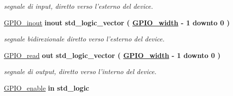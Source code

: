 \begin{DoxyCompactItemize}
\begin{DoxyCompactList}\small\item\em segnale di input, diretto verso l'esterno del device. \end{DoxyCompactList}\item 
\hypertarget{group__my_g_p_i_o_ga8829699d739ef35a4c5da396ffd38387}{\hyperlink{group__my_g_p_i_o_ga8829699d739ef35a4c5da396ffd38387}{G\+P\+I\+O\+\_\+inout}  {\bfseries {\bfseries \textcolor{vhdlchar}{inout}\textcolor{vhdlchar}{ }}} {\bfseries \textcolor{vhdlchar}{std\+\_\+logic\+\_\+vector}\textcolor{vhdlchar}{ }\textcolor{vhdlchar}{(}\textcolor{vhdlchar}{ }\textcolor{vhdlchar}{ }\textcolor{vhdlchar}{ }\textcolor{vhdlchar}{ }{\bfseries \hyperlink{group__my_g_p_i_o_ga0b52ca75e9a6093b2b60d5e851803069}{G\+P\+I\+O\+\_\+width}} \textcolor{vhdlchar}{-\/}\textcolor{vhdlchar}{ } \textcolor{vhdldigit}{1} \textcolor{vhdlchar}{ }\textcolor{vhdlchar}{downto}\textcolor{vhdlchar}{ }\textcolor{vhdlchar}{ } \textcolor{vhdldigit}{0} \textcolor{vhdlchar}{ }\textcolor{vhdlchar}{)}\textcolor{vhdlchar}{ }} }\label{group__my_g_p_i_o_ga8829699d739ef35a4c5da396ffd38387}

\begin{DoxyCompactList}\small\item\em segnale bidirezionale diretto verso l'esterno del device. \end{DoxyCompactList}\item 
\hypertarget{group__my_g_p_i_o_gafbe6792efd02cef42af7717592c1b04a}{\hyperlink{group__my_g_p_i_o_gafbe6792efd02cef42af7717592c1b04a}{G\+P\+I\+O\+\_\+read}  {\bfseries {\bfseries \textcolor{vhdlchar}{out}\textcolor{vhdlchar}{ }}} {\bfseries \textcolor{vhdlchar}{std\+\_\+logic\+\_\+vector}\textcolor{vhdlchar}{ }\textcolor{vhdlchar}{(}\textcolor{vhdlchar}{ }\textcolor{vhdlchar}{ }\textcolor{vhdlchar}{ }\textcolor{vhdlchar}{ }{\bfseries \hyperlink{group__my_g_p_i_o_ga0b52ca75e9a6093b2b60d5e851803069}{G\+P\+I\+O\+\_\+width}} \textcolor{vhdlchar}{-\/}\textcolor{vhdlchar}{ } \textcolor{vhdldigit}{1} \textcolor{vhdlchar}{ }\textcolor{vhdlchar}{downto}\textcolor{vhdlchar}{ }\textcolor{vhdlchar}{ } \textcolor{vhdldigit}{0} \textcolor{vhdlchar}{ }\textcolor{vhdlchar}{)}\textcolor{vhdlchar}{ }} }\label{group__my_g_p_i_o_gafbe6792efd02cef42af7717592c1b04a}

\begin{DoxyCompactList}\small\item\em segnale di output, diretto verso l'interno del device. \end{DoxyCompactList}\item 
\hypertarget{group__my_g_p_i_o_ga0ae7f62d9fa2c19d7ad2ad7574b58871}{\hyperlink{group__my_g_p_i_o_ga0ae7f62d9fa2c19d7ad2ad7574b58871}{G\+P\+I\+O\+\_\+enable}  {\bfseries {\bfseries \textcolor{vhdlchar}{in}\textcolor{vhdlchar}{ }}} {\bfseries \textcolor{vhdlchar}{std\+\_\+logic}\textcolor{vhdlchar}{ }} }\label{group__my_g_p_i_o_ga0ae7f62d9fa2c19d7ad2ad7574b58871}


\end{DoxyCompactItemize}
